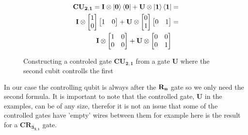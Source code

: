 \begin{figure}[H]
    \begin{align*}
        \mathbf{CU_{2,1}}=\mathbf{I}\otimes\ket{\mathbf{0}}\bra{\mathbf{0}} + \mathbf{U}\otimes\ket{\mathbf{1}}\bra{\mathbf{1}}&=\\
        \mathbf{I}\otimes
        \begin{bmatrix}
            1 \\
            0 \\
        \end{bmatrix}
        \begin{bmatrix}
            1 & 0 \\
        \end{bmatrix}+
        \mathbf{U}\otimes
        \begin{bmatrix}
            0 \\
            1 \\
        \end{bmatrix}
        \begin{bmatrix}
            0 & 1 \\
        \end{bmatrix}
        &=\\
        \mathbf{I}\otimes
        \begin{bmatrix}
            1 & 0 \\
            0 & 0 \\
        \end{bmatrix}+ 
        \mathbf{U}\otimes
        \begin{bmatrix}
            0 & 0 \\
            0 & 1 \\
        \end{bmatrix}& 
    \end{align*}
    \caption{Constructing a controled gate $\mathbf{CU_{2,1}}$ from a gate $\mathbf{U}$ where the second cubit controlls the first}
    \label{fig:CU1}
\end{figure}
\noindent
In our case the controlling qubit is always after the $\mathbf{R_{n}}$ gate so we only need the second formula. 
It is important to note that the controlled gate, $\mathbf{U}$ in the examples, can be of any size, therefor it is not an issue that some of the controlled gates have 'empty' wires between them for example here is the result for a $\mathbf{CR_{3_{3,1}}}$ gate. 
